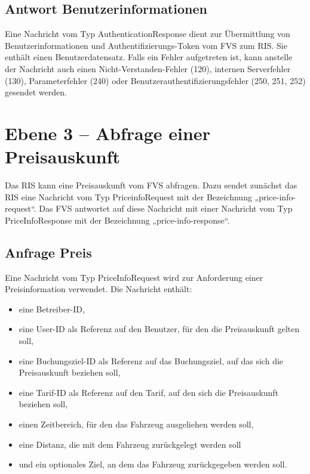 

\subsection{Antwort Benutzerinformationen}
Eine Nachricht vom Typ AuthenticationResponse dient zur Übermittlung von Benutzerinformationen und Authentifizierungs-Token vom FVS zum RIS. Sie enthält einen Benutzerdatensatz. Falls ein Fehler aufgetreten ist, kann anstelle der Nachricht auch einen Nicht-Verstanden-Fehler (120), internen Serverfehler (130), Parameterfehler (240) oder Benutzerauthentifizierungsfehler (250, 251, 252) gesendet werden.




\section{Ebene 3 -- Abfrage einer Preisauskunft}
Das RIS kann eine Preisauskunft vom FVS abfragen. Dazu sendet zunächst das RIS eine Nachricht vom Typ PriceinfoRequest mit der Bezeichnung „price-info-request“. Das FVS antwortet auf diese Nachricht mit einer Nachricht vom Typ PriceInfoResponse mit der Bezeichnung „price-info-response“.



\subsection{Anfrage Preis}
Eine Nachricht vom Typ PriceInfoRequest wird zur Anforderung einer Preisinformation verwendet. Die Nachricht enthält:
\begin{itemize}
\item eine Betreiber-ID,
\item eine User-ID als Referenz auf den Benutzer, für den die Preisauskunft gelten soll,
\item eine Buchungsziel-ID als Referenz auf das Buchungsziel, auf das sich die Preisauskunft beziehen soll,
\item eine Tarif-ID als Referenz auf den Tarif, auf den sich die Preisauskunft beziehen soll,
\item einen Zeitbereich, für den das Fahrzeug ausgeliehen werden soll,
\item eine Distanz, die mit dem Fahrzeug zurückgelegt werden soll
\item und ein optionales Ziel, an dem das Fahrzeug zurückgegeben werden soll.
\end{itemize}

